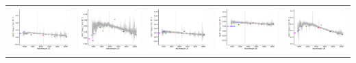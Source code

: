 \begin{center}
\begin{longtable}{l l l l l }
    \includegraphics[width=0.2\linewidth, clip]{Figs/Figs-sdss/spec-1143-52592-0242-SPLUS-s02s08-040033.pdf} & \includegraphics[width=0.2\linewidth, clip]{Figs/Figs-sdss/spec-1144-53238-0450-STRIPE82-0138-042700.pdf} & \includegraphics[width=0.2\linewidth, clip]{Figs/Figs-sdss/spec-1152-52941-0144-STRIPE82-0123-036291.pdf} & \includegraphics[width=0.2\linewidth, clip]{Figs/Figs-sdss/spec-1152-52941-0599-STRIPE82-0123-045029.pdf} & \includegraphics[width=0.2\linewidth, clip]{Figs/Figs-sdss/spec-1474-52933-0180-STRIPE82-0129-037205.pdf} \\

\end{longtable}
\end{center}
